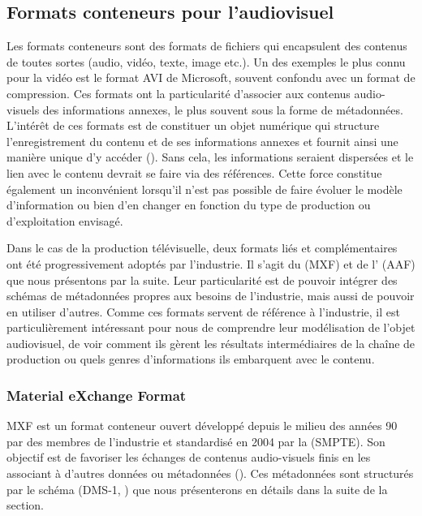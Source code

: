 \subsection{Formats conteneurs pour l'audiovisuel} \label{sec:wrapper}
Les formats conteneurs sont des formats de fichiers qui encapsulent des contenus de toutes sortes (audio, vidéo, texte, image etc.). 
Un des exemples le plus connu pour la vidéo est le format AVI de Microsoft, souvent confondu avec un format de compression. 
Ces formats ont la particularité d'associer aux contenus audio-visuels des informations annexes, le plus souvent sous la forme de métadonnées.
L'intérêt de ces formats est de constituer un objet numérique qui structure l'enregistrement du contenu et de ses informations annexes et fournit ainsi une manière unique d'y accéder (\cite{Ferreira2010}).
Sans cela, les informations seraient dispersées et le lien avec le contenu devrait se faire via des références. 
Cette force constitue également un inconvénient lorsqu'il n'est pas possible de faire évoluer le modèle d'information ou bien d'en changer en fonction du type de production ou d'exploitation envisagé.

Dans le cas de la production télévisuelle, deux formats liés et complémentaires ont été progressivement adoptés par l'industrie.  
Il s'agit du  (MXF) et de l' (AAF) que nous présentons par la suite. 
Leur particularité est de pouvoir intégrer des schémas de métadonnées propres aux besoins de l'industrie, mais aussi de pouvoir en utiliser d'autres. 
Comme ces formats servent de référence à l'industrie, il est particulièrement intéressant pour nous de comprendre leur modélisation de l'objet audiovisuel, de voir comment ils gèrent les résultats intermédiaires de la chaîne de production ou quels genres d'informations ils embarquent avec le contenu.


\subsubsection{Material eXchange Format}\label{sec:mxf}
MXF est un format conteneur ouvert développé depuis le milieu des années 90 par des membres de l'industrie et standardisé en 2004 par la  (SMPTE).
Son objectif est de favoriser les échanges de contenus audio-visuels finis en les associant à d'autres données ou métadonnées (\cite{Devlin2002}).
Ces métadonnées sont structurés par le schéma  (DMS-1, ) que nous présenterons en détails dans la suite de la section. 

